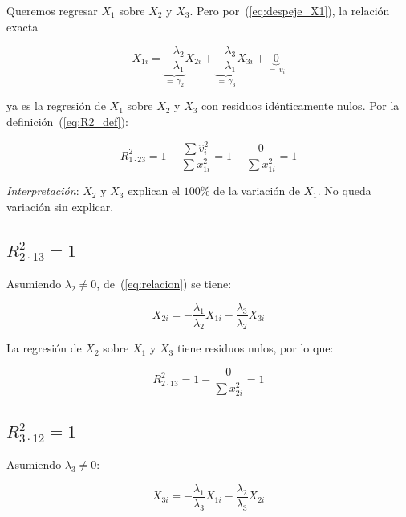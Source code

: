 \documentclass[12pt, letterpaper]{article}
\theoremstyle{remark}
\newcommand{\Rd}[2]{R^2_{#1 \cdot #2}} %
\begin{document}
Queremos regresar $X_1$ sobre $X_2$ y $X_3$. Pero por~(\ref{eq:despeje_X1}),
la relación exacta

\begin{equation}
  X_{1i}
    = \underbrace{-\frac{\lambda_2}{\lambda_1}}_{=\,\gamma_2} X_{2i}
    + \underbrace{-\frac{\lambda_3}{\lambda_1}}_{=\,\gamma_3} X_{3i}
    + \underbrace{0}_{=\,v_i}
  \label{eq:reg_exacta_1}
\end{equation}

\noindent ya es la regresión de $X_1$ sobre $X_2$ y $X_3$ con residuos idénticamente
nulos. Por la definición~(\ref{eq:R2_def}):

\begin{equation}
  \Rd{1}{23}
    = 1 - \frac{\sum \hat{v}_i^2}{\sum x_{1i}^2}
    = 1 - \frac{0}{\sum x_{1i}^2}
    = \boxed{1}
  \label{eq:R2_1_23}
\end{equation}

\noindent \textit{Interpretación}: $X_2$ y $X_3$ explican el $100\%$ de la
variación de $X_1$. No queda variación sin explicar.

\subsection{\texorpdfstring{$\Rd{2}{13} = 1$}{R2-2.13 = 1}}

Asumiendo $\lambda_2 \neq 0$, de~(\ref{eq:relacion}) se tiene:

\begin{equation}
  X_{2i} = -\frac{\lambda_1}{\lambda_2} X_{1i}
            -\frac{\lambda_3}{\lambda_2} X_{3i}
  \label{eq:despeje_X2}
\end{equation}

\noindent La regresión de $X_2$ sobre $X_1$ y $X_3$ tiene residuos nulos, por lo que:

\begin{equation}
  \Rd{2}{13}
    = 1 - \frac{0}{\sum x_{2i}^2}
    = \boxed{1}
  \label{eq:R2_2_13}
\end{equation}

\subsection{\texorpdfstring{$\Rd{3}{12} = 1$}{R2-3.12 = 1}}

Asumiendo $\lambda_3 \neq 0$:

\begin{equation}
  X_{3i} = -\frac{\lambda_1}{\lambda_3} X_{1i}
            -\frac{\lambda_2}{\lambda_3} X_{2i}
  \label{eq:despeje_X3}
\end{equation}
\end{document}
